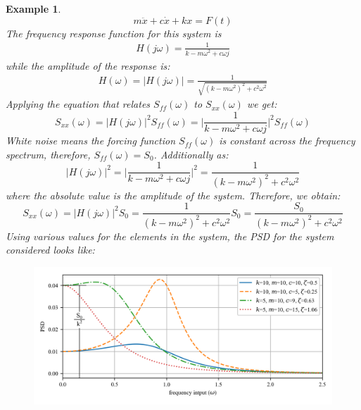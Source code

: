 \documentclass[12pt,letter]{article}
\newtheorem{ex}{Example}
\numberwithin{ex}{section} %
\newenvironment{example}{\begin{mdframed}[middlelinewidth=0.5mm]\begin{ex}\normalfont}{\end{ex}\end{mdframed}}
\begin{document}
\begin{example}
\begin{equation}
m\ddot{x} +c\dot{x} + kx = F(t)
\end{equation} 
The frequency response function for this system is 
\begin{eqnarray}
	H(j\omega) = \frac{1}{k-m\omega^2+c\omega j}
\end{eqnarray}
while the amplitude of the response is:
\begin{eqnarray}
H(\omega) = |H(j\omega)| = \frac{1}{\sqrt{(k-m\omega^2)^2+c^2\omega^2}}
\end{eqnarray}
Applying the equation that relates $S_{ff}(\omega)$ to $S_{xx}(\omega)$ we get:
\begin{equation}
S_{xx}(\omega) =  |H(j\omega)|^2 S_{ff}(\omega) = \bigg|\frac{1}{k-m\omega^2+c\omega j} \bigg|^2 S_{ff}(\omega) 
\end{equation}
White noise means the forcing function $S_{ff}(\omega)$ is constant across the frequency spectrum, therefore, $S_{ff}(\omega)=S_0$. Additionally as:
\begin{equation}
|H(j\omega)|^2 = \bigg|\frac{1}{k-m\omega^2+c\omega j} \bigg|^2 = \frac{1}{(k-m\omega^2)^2+c^2\omega^2}
\end{equation}
where the absolute value is the amplitude of the system. Therefore, we obtain:
\begin{equation}
S_{xx}(\omega) =  |H(j\omega)|^2 S_{0}= \frac{1}{(k-m\omega^2)^2+c^2\omega^2}S_0 = \frac{S_0}{(k-m\omega^2)^2+c^2\omega^2}
\end{equation}
Using various values for the elements in the system, the PSD for the system considered looks like:
\begin{figure}[H]
	\centering
	\includegraphics[width=1\textwidth]{../Figures/response_to_white_noise_with_annotation.png}
\end{figure}

\end{example}  
\end{document}
